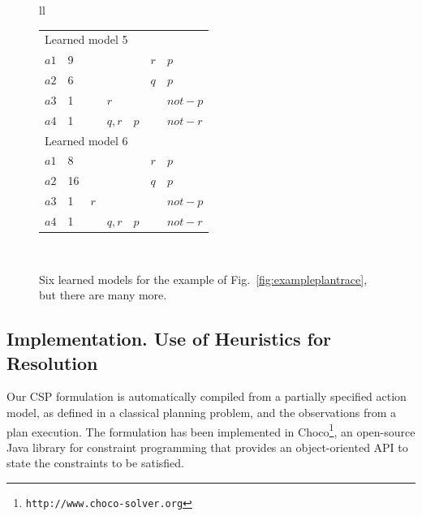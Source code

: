 \documentclass[runningheads]{llncs}
\begin{document}
\begin{figure}
\begin{tabular}{ll}
\begin{tabular}{lllllll}
\hline

\multicolumn{7}{l}{Learned model 5} \\
$a1$ & 9 & & & & $r$ & $p$ \\
$a2$ & 6 & & & & $q$ & $p$ \\
$a3$ & 1 & & $r$ & & & $not-p$ \\
$a4$ & 1 & & $q,r$ & $p$ & & $not-r$ \\

\hline

\multicolumn{7}{l}{Learned model 6} \\
$a1$ & 8 & & & & $r$ & $p$ \\
$a2$ & 16 & & & & $q$ & $p$ \\
$a3$ & 1 & $r$ & & & & $not-p$ \\
$a4$ & 1 & & $q,r$ & $p$ & & $not-r$ \\

\end{tabular} \\

\end{tabular}
\normalsize

\caption{Six learned models for the example of Fig.~\ref{fig:exampleplantrace}, but there are many more.}
\label{figure:solutionsExample}
\end{figure}






\subsection{Implementation. Use of Heuristics for Resolution}
\label{sec:implementation}

Our CSP formulation is automatically compiled from a partially specified action model, as defined in a classical planning problem, and the observations from a plan execution.
The formulation has been implemented in \textsf{Choco}\footnote{\texttt{http://www.choco-solver.org}}, an open-source Java library for constraint programming that provides an object-oriented API to state the constraints to be satisfied.
\end{document}
